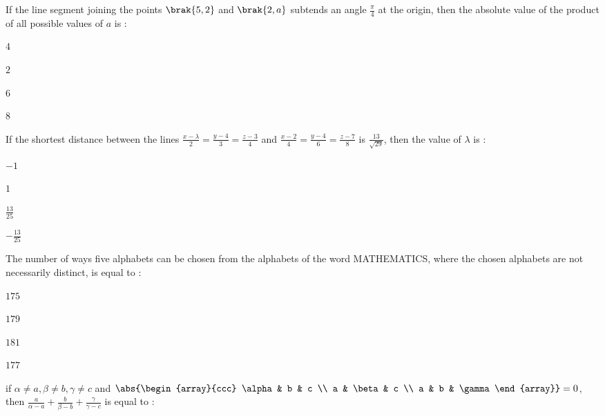 \iffalse
\title{2024}
\author{EE24BTECH11050-Pothuri Rahul}
\section{mcq-single}
\fi
\item %
If the line segment joining the points $\brak{5,2}$ and $\brak{2,a}$ subtends an angle $\frac{\pi}{4}$ at the origin, then the absolute value of the product of all possible values of $a$ is :
\begin{enumerate}
\begin{multicols}{4}
\item $4$
\item $2$
\item $6$
\item $8$
\end{multicols}
\end{enumerate}
\item %
If the shortest distance between the lines $\frac{x - \lambda}{2} = \frac{y - 4}{3} = \frac{z - 3}{4}$ and $\frac{x - 2}{4} = \frac{y - 4}{6} = \frac{z - 7}{8}$ is $\frac{13}{\sqrt{29}}$, then the value of $\lambda$ is :
\begin{enumerate}
\begin{multicols}{4}
\item $-1$
\item $1$
\item $\frac{13}{25}$
\item $ - \frac{13}{25}$
\end{multicols}
\end{enumerate}
\item %
The number of ways five alphabets can be chosen from the alphabets of the word MATHEMATICS, where the chosen alphabets are not necessarily distinct, is equal to :
\begin{enumerate}
\begin{multicols}{4}
\item $175$
\item $179$
\item $181$
\item $177$
\end{multicols}
\end{enumerate}
\item %
if $\alpha \neq a, \beta \neq b, \gamma \neq c$ and  
$\abs{\begin{array}{ccc}
\alpha & b & c \\ a & \beta & c \\ a & b & \gamma \end{array}} =0 $, then $\frac{a}{\alpha - a}+\frac{b}{\beta - b}+\frac{\gamma}{\gamma - c}$ is equal to :
